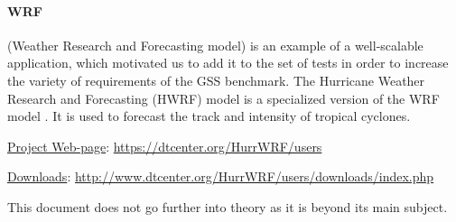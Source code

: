 \paragraph{WRF} (Weather Research and Forecasting model) is an example of a well-scalable application,
which motivated us to add it to the set of tests in order to increase the variety of requirements of the {GSS benchmark}. 
The Hurricane Weather Research and Forecasting (HWRF) model is a specialized version of the WRF model \cite{2018:hwrf}.
It is used to forecast the track and intensity of tropical cyclones.

\underline{Project Web-page}: \url{https://dtcenter.org/HurrWRF/users}

\underline{Downloads}: \url{http://www.dtcenter.org/HurrWRF/users/downloads/index.php}

\iffalse
\underline{Hurricane WRF software}

\fi


This document does not go further into theory as it is beyond its main subject.
